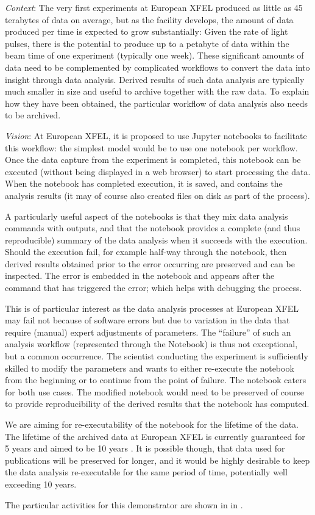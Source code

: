   \emph{Context}: The very first experiments at European XFEL
  produced as little as 45 terabytes of data on average, but as the
  facility develops, the amount of data produced per time is expected
  to grow substantially: Given the rate of light pulses, there is the
  potential to produce up to a petabyte of data within the beam time
  of one experiment (typically one week). These significant amounts of
  data need to be complemented by complicated workflows to convert the
  data into insight through data analysis. Derived results of such
  data analysis are typically much smaller in size and useful to
  archive together with the raw data. To explain how they have been
  obtained, the particular workflow of data analysis also needs to be
  archived.

  \medskip
  \emph{Vision}:
  At European XFEL, it is proposed to use Jupyter notebooks to facilitate
  this workflow: the simplest model would be to use one notebook per
  workflow. Once the data capture from the experiment is completed,
  this notebook can be executed (without being displayed in a web
  browser) to start processing the data. When the notebook has
  completed execution, it is saved, and contains the analysis results
  (it may of course also created files on disk as part of the
  process).

  A particularly useful aspect of the notebooks is that they mix data
  analysis commands with outputs, and that the notebook provides a
  complete (and thus reproducible) summary of the data analysis when
  it succeeds with the execution. Should the execution fail, for
  example half-way through the notebook, then derived results obtained
  prior to the error occurring are preserved and can be inspected. The
  error is embedded in the notebook and appears after the command that
  has triggered the error; which helps with debugging the process.

  This is of particular interest as the data analysis processes at
  European XFEL may fail not because of software errors but due to
  variation in the data that require (manual) expert adjustments of
  parameters. The ``failure'' of such an analysis workflow
  (represented through the Notebook) is thus not exceptional, but a
  common occurrence. The scientist conducting the experiment is
  sufficiently skilled to modify the parameters and wants to either
  re-execute the notebook from the beginning or to continue from the
  point of failure. The notebook caters for both use cases. The
  modified notebook would need to be preserved of course to provide
  reproducibility of the derived results that the notebook has
  computed.

  We are aiming for re-executability of the notebook for the lifetime
  of the data. The lifetime of the archived data at European XFEL is
  currently guaranteed for 5 years and aimed to be 10 years
  \cite{EuXFEL-datapolicy-2017}. It is possible though, that data used
  for publications will be preserved for longer, and it would be
  highly desirable to keep the data analysis re-executable for the
  same period of time, potentially well exceeding 10 years.

  The particular activities for this demonstrator are shown in
   in .
